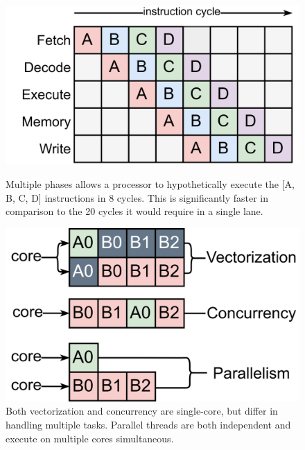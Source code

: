 \documentclass{article}
\begin{document}
\begin{figure}[ht]
    \centering
    \begin{minipage}{.5\textwidth}
        \centering
        \includegraphics[scale=0.09]{instructionpipeline.png}
        \captionsetup{margin=0.2cm}
        \caption
        { 
            Multiple phases allows a processor to hypothetically execute the [A, B, C, D] instructions in 8 cycles.
            This is significantly faster in comparison to the 20 cycles it would require in a single lane.
        }
    \end{minipage}%
    \begin{minipage}{.5\textwidth}
        \centering
        \includegraphics[scale=0.09]{vectorizationvsthreads.png}
        \captionsetup{margin=0.2cm}
        \caption
        { 
            Both vectorization and concurrency are single-core, but differ in handling multiple tasks.
            Parallel threads are both independent and execute on multiple cores simultaneous.      
        }
    \end{minipage}
\end{figure}
\end{document}
